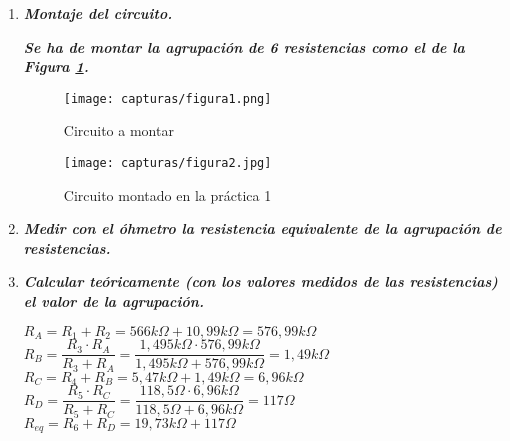 \begin{enumerate}
	\item \textbf{\textit{Montaje del circuito.}}
	
		\textbf{\textit{Se ha de montar la agrupación de 6 resistencias como el de la Figura \ref{fig:figura1}.}}
		
		\begin{figure}[H] %
			\centering
			\texttt{[image: capturas/figura1.png]} 
			\caption{Circuito a montar}
			\label{fig:figura1}
		\end{figure}
		\begin{figure}[H] %
			\centering
			\texttt{[image: capturas/figura2.jpg]} 
			\caption{Circuito montado en la práctica 1}
			\label{fig:figura2}
		\end{figure}
	
	\item \textbf{\textit{Medir con el óhmetro la resistencia equivalente de la agrupación de resistencias.}}	
		\begin{center}
			{\fboxrule=1pt \fboxsep=6pt
				}
		\end{center}
	
	\item \textbf{\textit{Calcular teóricamente (con los valores medidos de las resistencias) el valor de la agrupación.}}
		\begin{center}
			$ R_{A} =  R_{1} + R_{2} = 566 k\Omega + 10,99 k\Omega = 576,99 k\Omega$
			\\
			
			$ R_{B} =  \dfrac{R_{3} \cdot R_{A}}{R_{3} + R_{A}} = \dfrac{1,495 k\Omega \cdot 576,99 k\Omega}{1,495 k\Omega + 576,99 k\Omega} = 1,49 k\Omega$
			\\
			
			$ R_{C} =  R_{4} + R_{B} = 5,47 k\Omega + 1,49 k\Omega = 6,96 k\Omega$
			\\
			
			$ R_{D} =  \dfrac{R_{5} \cdot R_{C}}{R_{5} + R_{C}} = \dfrac{118,5 \Omega \cdot 6,96 k\Omega}{118,5 \Omega + 6,96 k\Omega} = 117 \Omega$
			\\
			
			$ R_{e q} =  R_{6} + R_{D} = 19,73 k\Omega + 117 \Omega $ 
			
			\begin{center}			
				{\fboxrule=1pt \fboxsep=6pt
					}
			\end{center}
		\end{center}	
	

\end{enumerate}

